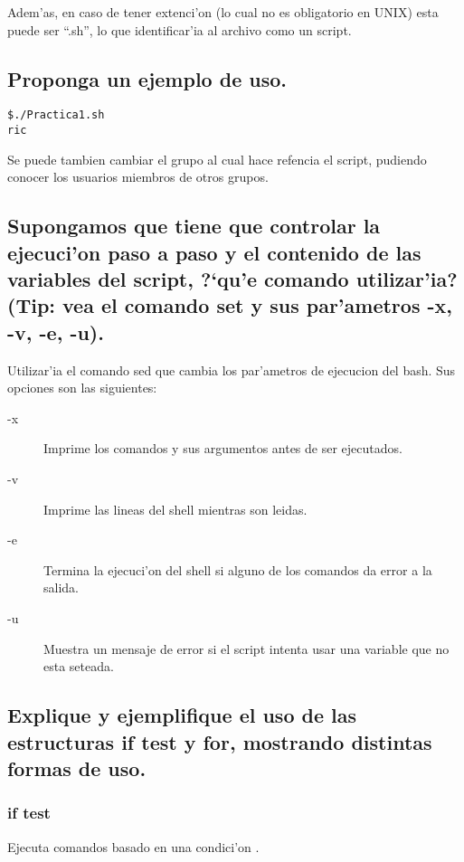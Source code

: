 \documentclass[a4paper,11pt]{article}
\newcommand{\?}{?`}
\begin{document}
Adem'as, en caso de tener extenci'on (lo cual no es obligatorio en UNIX) esta puede ser ``.sh'', lo que identificar'ia al archivo como un script.

\subsection[Punto E]{Proponga un ejemplo de uso.}

\begin{lstlisting}[title=Ejemplo de uso]
$./Practica1.sh
ric
\end{lstlisting}

Se puede tambien cambiar el grupo al cual hace refencia el script, pudiendo conocer los usuarios miembros de otros grupos.

\subsection[Punto F]{Supongamos que tiene que controlar la ejecuci'on paso a paso y el contenido de
las variables del script, \?qu'e comando utilizar'ia? (Tip: vea el comando set y sus
par'ametros -x, -v, -e, -u).}

Utilizar'ia el comando sed que cambia los par'ametros de ejecucion del bash. Sus opciones son las siguientes:

\begin{description}
 \item [-x] Imprime los comandos y sus argumentos antes de ser ejecutados.
 \item [-v] Imprime las lineas del shell mientras son leidas.
 \item [-e] Termina la ejecuci'on del shell si alguno de los comandos da error a la salida.
 \item [-u] Muestra un mensaje de error si el script intenta usar una variable que no esta seteada.
\end{description}

\subsection[Punto G]{Explique y ejemplifique el uso de las estructuras if test y for, mostrando distintas
formas de uso.}

\subsubsection{if test}  

Ejecuta comandos basado en una condici'on .
\end{document}
